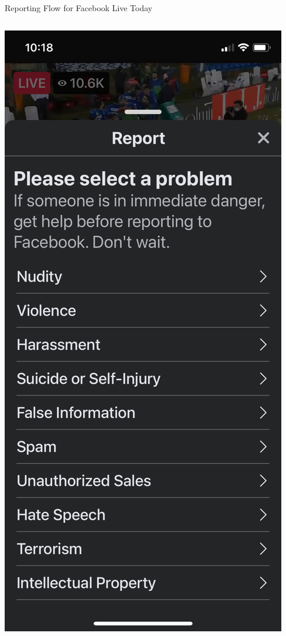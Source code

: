 \documentclass[nobackground,dvipsnames,table]{beamer}
\begin{document}
\begin{frame}{Reporting Flow for Facebook Live Today}
    \begin{columns}
            \includegraphics[width=\textwidth]{facebook-live-current-reporting-flow-1}

\end{columns}
\end{frame}
\end{document}
